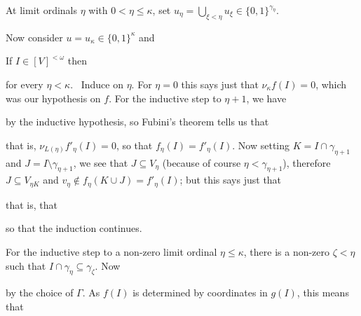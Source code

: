 {At limit ordinals $\eta$ with $0<\eta\le\kappa$, set
$u_{\eta}=\bigcup_{\xi<\eta}u_{\xi}\in\{0,1\}^{\gamma_{\eta}}$.

\medskip

  Now consider $u=u_{\kappa}\in\{0,1\}^{\kappa}$ and


\noindent If $I\in[V]^{<\omega}$ then


\noindent for every $\eta<\kappa$.  \Prf\ Induce on $\eta$.  For
$\eta=0$ this says just that
$\nu_{\kappa}f(I)=0$, which was our hypothesis on $f$.
For the inductive step to $\eta+1$, we have


\noindent by the inductive hypothesis, so Fubini's theorem tells
us that


\noindent that is, $\nu_{L(\eta)}f'_{\eta}(I)=0$, so that
$f_{\eta}(I)=f'_{\eta}(I)$.   Now setting
$K=I\cap\gamma_{\eta+1}$ and $J=I\setminus\gamma_{\eta+1}$, we see that
$J\subseteq V_{\eta}$ (because of course $\eta<\gamma_{\eta+1}$),
therefore $J\subseteq V_{\eta K}$ and
$v_{\eta}\notin f_{\eta}(K\cup J)=f'_{\eta}(I)$;  but this says just that


\noindent that is, that


\noindent so that the induction continues.

For the inductive step to a non-zero limit ordinal
$\eta\le\kappa$, there is a non-zero $\zeta<\eta$ such that
$I\cap\gamma_{\eta}\subseteq\gamma_{\zeta}$.   Now


\noindent by the choice of $\Gamma$.   As $f(I)$ is determined by
coordinates in $g(I)$, this means that


}
